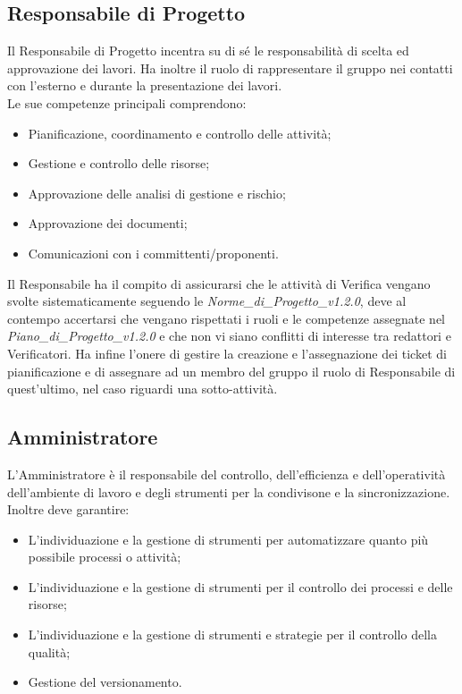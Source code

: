 \subsection{Responsabile di Progetto} %
\label{2.1}
Il Responsabile di Progetto incentra su di sé le responsabilità di scelta ed approvazione dei lavori. Ha inoltre il ruolo di rappresentare il gruppo nei contatti con l'esterno e durante la presentazione dei lavori.\\
Le sue competenze principali comprendono:
\begin{itemize}
\item Pianificazione, coordinamento e controllo delle attività;
\item Gestione e controllo delle risorse;
\item Approvazione delle analisi di gestione e rischio;
\item Approvazione dei documenti;
\item Comunicazioni con i committenti/proponenti.
\end{itemize}
Il Responsabile ha il compito di assicurarsi che le attività di Verifica vengano svolte sistematicamente seguendo le \emph{Norme_di_Progetto_v1.2.0}, deve al contempo accertarsi che vengano rispettati i ruoli e le competenze assegnate nel \emph{Piano_di_Progetto_v1.2.0} e che non vi siano conflitti di interesse tra redattori e Verificatori. Ha infine l'onere di gestire la creazione e l'assegnazione dei ticket di pianificazione e di assegnare ad un membro del gruppo il ruolo di Responsabile di quest'ultimo, nel caso riguardi una sotto-attività.

\subsection{Amministratore}
\label{2.2}
L'Amministratore è il responsabile del controllo, dell'efficienza e dell'operatività dell'ambiente di lavoro e degli strumenti per la condivisone e la sincronizzazione.\\
Inoltre deve garantire:
\begin{itemize}
\item L'individuazione e la gestione di strumenti per automatizzare quanto più possibile processi o attività;
\item L'individuazione e la gestione di strumenti per il controllo dei processi e delle risorse;
\item L'individuazione e la gestione di strumenti e strategie per il controllo della qualità;
\item Gestione del versionamento.
\end{itemize}


